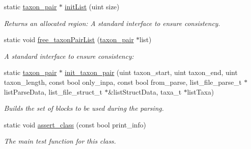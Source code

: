 \begin{DoxyCompactItemize}
\item 
\hypertarget{classtaxon__pair_aa6dfda21f5ef6e4a531a6bf159904898}{
static \hyperlink{classtaxon__pair}{taxon\_\-pair} $\ast$ \hyperlink{classtaxon__pair_aa6dfda21f5ef6e4a531a6bf159904898}{initList} (uint size)}
\label{classtaxon__pair_aa6dfda21f5ef6e4a531a6bf159904898}

\begin{DoxyCompactList}\small\item\em Returns an allocated region: A standard interface to ensure consistency. \end{DoxyCompactList}\item 
\hypertarget{classtaxon__pair_ac0dc294ced6676c12e5cf919e7cce7f3}{
static void \hyperlink{classtaxon__pair_ac0dc294ced6676c12e5cf919e7cce7f3}{free\_\-taxonPairList} (\hyperlink{classtaxon__pair}{taxon\_\-pair} $\ast$list)}
\label{classtaxon__pair_ac0dc294ced6676c12e5cf919e7cce7f3}

\begin{DoxyCompactList}\small\item\em A standard interface to ensure consistency: \end{DoxyCompactList}\item 
\hypertarget{classtaxon__pair_ae3224696063e2fdcad16663863ecfc99}{
static \hyperlink{classtaxon__pair}{taxon\_\-pair} $\ast$ \hyperlink{classtaxon__pair_ae3224696063e2fdcad16663863ecfc99}{init\_\-taxon\_\-pair} (uint taxon\_\-start, uint taxon\_\-end, uint taxon\_\-length, const bool only\_\-inpa, const bool from\_\-parse, list\_\-file\_\-parse\_\-t $\ast$listParseData, list\_\-file\_\-struct\_\-t $\ast$\&listStructData, taxa\_\-t $\ast$listTaxa)}
\label{classtaxon__pair_ae3224696063e2fdcad16663863ecfc99}

\begin{DoxyCompactList}\small\item\em Builds the set of blocks to be used during the parsing. \end{DoxyCompactList}\item 
\hypertarget{classtaxon__pair_ad6b155c80830060b265e058c1f567770}{
static void \hyperlink{classtaxon__pair_ad6b155c80830060b265e058c1f567770}{assert\_\-class} (const bool print\_\-info)}
\label{classtaxon__pair_ad6b155c80830060b265e058c1f567770}

\begin{DoxyCompactList}\small\item\em The main test function for this class. \end{DoxyCompactList}\end{DoxyCompactItemize}
